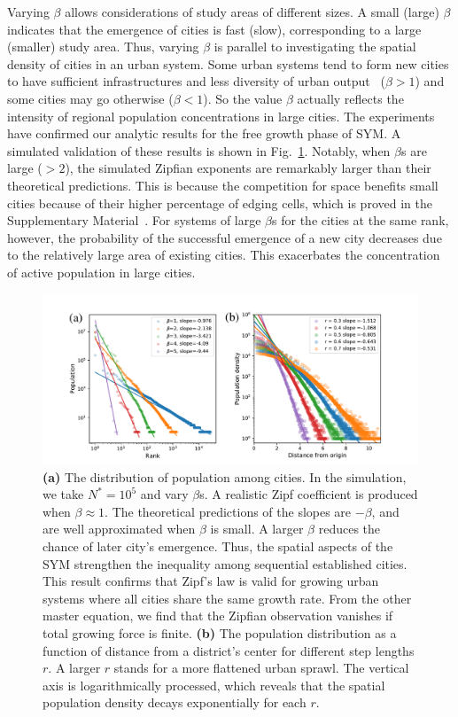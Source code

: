 Varying $\beta$ allows considerations of study areas of different sizes. A small (large) $\beta$ indicates that the emergence of cities is fast (slow), corresponding to a large (smaller) study area. %
Thus, varying $\beta$ is parallel to investigating the spatial density of cities in an urban system. Some urban systems tend to form new cities to have sufficient infrastructures and less diversity of urban output~\cite{batty2008size} ($\beta > 1$) and some cities may go otherwise ($\beta< 1$). So the value $\beta$ actually reflects the intensity of regional population concentrations in large cities. The experiments have confirmed our analytic results for the free growth phase of SYM. %
A simulated validation of these results is shown in Fig.~\ref{Fig2}. Notably, when $\beta$s are large ($>2$), the simulated Zipfian exponents are remarkably larger than their theoretical predictions. This is because the competition for space benefits small %
cities because of their higher percentage of edging cells, which is proved in the Supplementary Material~\cite{SuppInfo}. For systems of large $\beta$s for the cities at the same rank, however, the probability of the successful emergence of a new city decreases due to the relatively large area of existing cities. This exacerbates the concentration of active population in large cities.%
\begin{figure}[t]
	\centering
	\includegraphics[width = .99\linewidth]{Pics/Zipf_Clark.pdf}
	\caption{\textbf{(a)} The distribution of population among cities. In the simulation, we take $N^* = 10^5$ and vary $\beta$s. A realistic Zipf coefficient is produced when $\beta\approx 1$. The theoretical predictions of the slopes are $-\beta$, and are well approximated when $\beta$ is small. A larger $\beta$ reduces the chance of later city's emergence. Thus, the spatial aspects of the SYM strengthen the inequality among sequential established cities. This result confirms that Zipf's law is valid for growing urban systems where all cities share the same growth rate. From the other master equation, we find that the Zipfian observation vanishes if total growing force is finite. \textbf{(b)} The population distribution as a function of distance from a district's center for different step lengths $r$. A larger $r$ stands for a more flattened urban sprawl. The vertical axis is logarithmically processed, which reveals that the spatial population density decays exponentially for each $r$.}
	\label{Fig2}
\end{figure}

